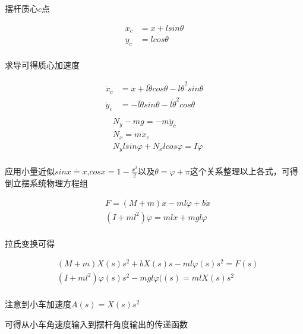摆杆质心$c$点
	
\begin{equation}
\begin{aligned}
x_c&=x+lsin\theta\\
y_c&=lcos\theta\\
\end{aligned}
\end{equation}

求导可得质心加速度

\begin{equation}
\begin{aligned}
\ddot x_c&=\ddot x+l\ddot{\theta}cos\theta-l\dot{\theta}^2sin\theta\\
\ddot y_c&=-l\ddot{\theta}sin\theta-l\dot{\theta}^2cos\theta\\
\end{aligned}
\end{equation}
\begin{equation}
\begin{aligned}
&N_y-mg=-m\ddot y_c\\
&N_x=m\ddot x_c\\
&N_ylsin\varphi+N_xlcos\varphi=I\ddot{\varphi}\\
\end{aligned}
\end{equation}

应用小量近似$sinx\doteq x$,$cosx=1-\frac{x^2}{2}$以及$\theta=\varphi+\pi$这个关系整理以上各式，可得倒立摆系统物理方程组

\begin{equation}
\begin{aligned}
&F=(M+m)\ddot x-ml\ddot{\varphi}+b\dot x\\
&(I+ml^2)\ddot{\varphi}=ml\ddot x+mgl\varphi\\
\end{aligned}
\end{equation}

拉氏变换可得

\begin{equation}
\begin{aligned}
&(M+m)X(s)s^2+bX(s)s-ml\varphi(s)s^2=F(s)\\
&(I+ml^2)\varphi(s)s^2-mgl\varphi((s)=mlX(s)s^2\\
\end{aligned}
\end{equation}

注意到小车加速度$A(s)=X(s)s^2$

可得从小车角速度输入到摆杆角度输出的传递函数

